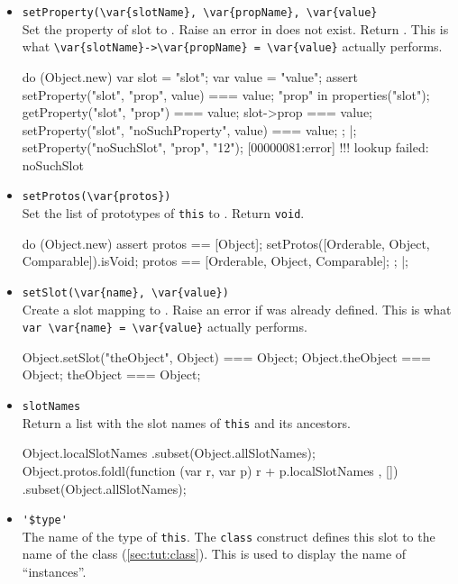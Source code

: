 \begin{itemize}
\item \lstinline|setProperty(\var{slotName}, \var{propName}, \var{value}|\\
  Set the property  of slot  to
  .  Raise an error in  does not exist.
  Return .  This is what
  \lstinline|\var{slotName}->\var{propName} = \var{value}| actually
  performs.
\begin{urbiscript}
do (Object.new)
{
  var slot = "slot";
  var value = "value";
  assert
  {
    setProperty("slot", "prop", value) === value;
    "prop" in properties("slot");
    getProperty("slot", "prop") === value;
    slot->prop === value;
    setProperty("slot", "noSuchProperty", value) === value;
 };
}|;
setProperty("noSuchSlot", "prop", "12");
[00000081:error] !!! lookup failed: noSuchSlot
\end{urbiscript}


\item \lstinline|setProtos(\var{protos})|\\
  Set the list of prototypes of \lstinline|this| to .
  Return \lstinline|void|.
\begin{urbiscript}
do (Object.new)
{
  assert
  {
    protos == [Object];
    setProtos([Orderable, Object, Comparable]).isVoid;
    protos == [Orderable, Object, Comparable];
  };
}|;
\end{urbiscript}

\item \lstinline|setSlot(\var{name}, \var{value})|\\
  Create a slot  mapping to . Raise an error if
   was already defined.  This is what
  \lstinline|var \var{name} = \var{value}| actually performs.
\begin{urbiassert}
Object.setSlot("theObject", Object) === Object;
Object.theObject === Object;
theObject === Object;
\end{urbiassert}

\item \lstinline|slotNames|\\
  Return a list with the slot names of \lstinline|this| and its
  ancestors.
\begin{urbiassert}
Object.localSlotNames
  .subset(Object.allSlotNames);
Object.protos.foldl(function (var r, var p) { r + p.localSlotNames },
                    [])
  .subset(Object.allSlotNames);
\end{urbiassert}

\item \lstinline|'$type'|\\ %
  The name of the type of \lstinline|this|.  The \lstinline|class|
  construct defines this slot to the name of the class
  (\autoref{sec:tut:class}).  This is used to display the name of
  ``instances''.


\end{itemize}
